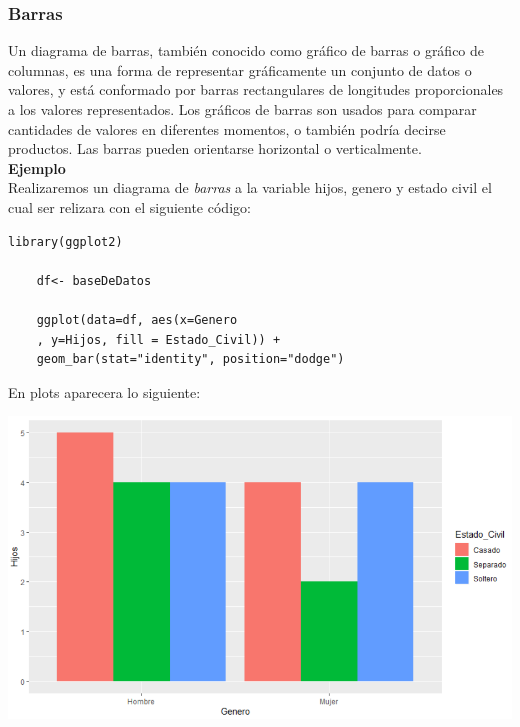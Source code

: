 \documentclass[12pt,hidelinks]{article}
\begin{document}
	\subsubsection{Barras}
	Un diagrama de barras, también conocido como gráfico de barras o gráfico de columnas, es una forma de representar gráficamente un conjunto de datos o valores, y está conformado por barras rectangulares de longitudes proporcionales a los valores representados. Los gráficos de barras son usados para comparar cantidades de valores en diferentes momentos, o también podría decirse productos. Las barras pueden orientarse horizontal o verticalmente.\\
	\textbf{Ejemplo}\\
	Realizaremos un diagrama de \textit{barras} a la variable hijos, genero y estado civil el cual ser relizara con el siguiente código:
	\begin{lstlisting}[frame=single]
	library(ggplot2)
	
	df<- baseDeDatos
	
	ggplot(data=df, aes(x=Genero
	, y=Hijos, fill = Estado_Civil)) + 
	geom_bar(stat="identity", position="dodge")
	\end{lstlisting}
	En plots aparecera lo siguiente:
	\begin{center}
		\includegraphics[width = 14cm]{GraficaBarras.PNG}
	\end{center}
	
	
\end{document}
